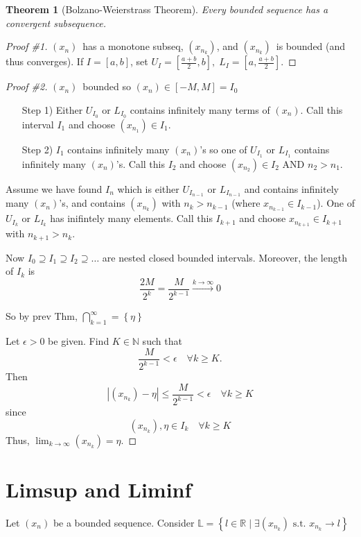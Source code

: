 \documentclass{report}
\newcommand{\N}{\mathbb{N}}  %
\newcommand{\R}{\mathbb{R}}  %
\newcommand{\xn}{(x_n)}
\newcommand{\xnkp}{(x_{n_k})}
\theoremstyle{mystyle}
\theoremstyle{customtheorem}
\newtheorem{customthm}{Theorem}
\begin{document}
    \begin{customthm}[Bolzano-Weierstrass Theorem]
        Every bounded sequence has a convergent subsequence.
    \end{customthm}

    \begin{proof}[Proof \#1]
        $\xn$\ has a monotone subseq, $\xnkp$, and $\xnkp$\ is bounded (and thus converges). If $I=[a,b]$, set $U_I=[\frac{a+b}{2}, b],\; L_I=[a, \frac{a+b}{2}]$.
    \end{proof}

    \begin{proof}[Proof \#2]
        $\xn$\ bounded so $\xn$$\in [-M, M]=I_0$
        \begin{enumerate}
            \item[Step 1)] Either $U_{I_0}$ or $L_{I_0}$ contains infinitely many terms of $\xn$. Call this interval $I_1$ and choose $(x_{n_1})\in I_1$.
            \item[Step 2)] $I_1$ contains infinitely many $\xn$'s so one of $U_{I_1}$ or $L_{I_1}$ contains infinitely many $\xn$'s. Call this $I_2$ and choose $(x_{n_2})\in I_2$ AND $n_2 > n_1$.
        \end{enumerate}

        Assume we have found $I_n$ which is either $U_{I_{n-1}}$ or $L_{I_{n-1}}$ and contains infinitely many $\xn$'s, and contains $\xnkp$ with $n_k > n_{k-1}$ (where $x_{n_{k-1}}\in I_{k-1}$). One of $U_{I_k}$ or $L_{I_k}$ has inifintely many elements. Call this $I_{k+1}$ and choose $x_{n_{k+1}}\in I_{k+1}$ with $n_{k+1} > n_k$.

        Now $I_0 \supseteq I_1 \supseteq I_2 \supseteq \ldots$ are nested closed bounded intervals. Moreover, the length of $I_k$ is
        \[\frac{2M}{2^k}=\frac{M}{2^{k-1}}\xrightarrow{k\rightarrow\infty}0\]

        So by prev Thm, $\bigcap^\infty_{k=1}=\left\{\eta\right\}$

        Let $\epsilon > 0$ be given. Find $K\in\N$ such that \[\frac{M}{2^{k-1}}<\epsilon\quad \forall k\geq K.\] Then
        \[ \left|\xnkp-\eta\right| \leq \frac{M}{2^{k-1}} < \epsilon \quad \forall k \geq K\]
        since \[\xnkp, \eta \in I_k \quad \forall k\geq K\]
        Thus, $\lim_{k\rightarrow\infty}\xnkp=\eta$.
    \end{proof}

    \section*{Limsup and Liminf}
    Let $\xn$ be a bounded sequence. Consider $\mathbb{L}=\left\{l\in\R \; \vert\; \exists \xnkp \text{ s.t. } x_{n_k}\rightarrow l\right\}$
\end{document}
